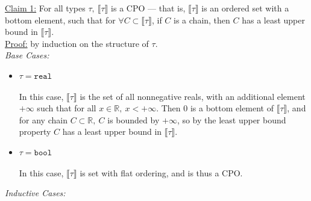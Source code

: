 \documentclass{westhesis}
\newcommand{\R}{\mathbb{R}}
\begin{document}
\underline{Claim 1:} For all types $\tau, \ \llbracket \tau \rrbracket$ is a CPO --- that is, $\llbracket \tau \rrbracket$ is an ordered 
set with a bottom element, such that for $\forall C \subset \llbracket \tau \rrbracket$, if  $C$ is a chain, then $C$ has a least 
upper bound in $\llbracket \tau \rrbracket$. \\
\underline{Proof:} by induction on the structure of $\tau$. \\
\emph{Base Cases: }
\begin{itemize}
\item $\tau = \texttt{real}$ \\ \\
In this case, $\llbracket \tau \rrbracket$ is the set of all nonnegative reals, with an additional element $+\infty$ such that for all
$x \in \R, \ x < +\infty$. Then $0$ is a bottom element of $\llbracket \tau \rrbracket$, and for any chain $C \subset \R, \ C$ is bounded by $+\infty$, so by the least upper bound property $C$ has a least upper bound in $\llbracket \tau \rrbracket$.
\item $\tau = \texttt{bool}$ \\ \\
In this case, $\llbracket \tau \rrbracket$ is set with flat ordering, and is thus a CPO. \\ 
\end{itemize}
\emph{Inductive Cases: }
\end{document}
